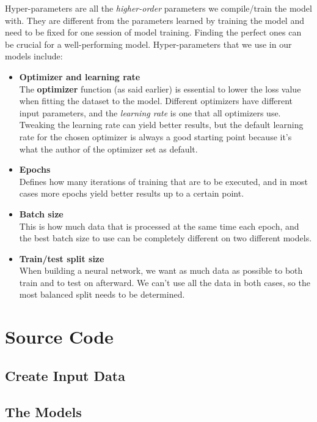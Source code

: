Hyper-parameters are all the \textit{higher-order} parameters we compile/train the model with. They are different from the parameters learned by training the model and need to be fixed for one session of model training. Finding the perfect ones can be crucial for a well-performing model. Hyper-parameters that we use in our models include:

\begin{itemize}
      \item \textbf{Optimizer and learning rate}\\
          The \textbf{optimizer} function (as said earlier) is essential to lower the loss value when fitting the dataset to the model. 
          Different optimizers have different input parameters, and the \textit{learning rate} is one that all optimizers use. 
          Tweaking the learning rate can yield better results, but the default learning rate for the chosen optimizer is always a good starting point because it's what the author of the optimizer set as default.
      \item \textbf{Epochs}\\
          Defines how many iterations of training that are to be executed, and in most cases more epochs yield better results up to a certain point.
      \item \textbf{Batch size}\\
          This is how much data that is processed at the same time each epoch, and the best batch size to use can be completely different on two different models. 
      \item \textbf{Train/test split size}\\
          When building a neural network, we want as much data as possible to both train and to test on afterward. We can't use all the data in both cases, so the most balanced split needs to be determined.
  \end{itemize}
\newpage

\section{Source Code}
\subsection{Create Input Data}


\newpage
\subsection{The Models}
